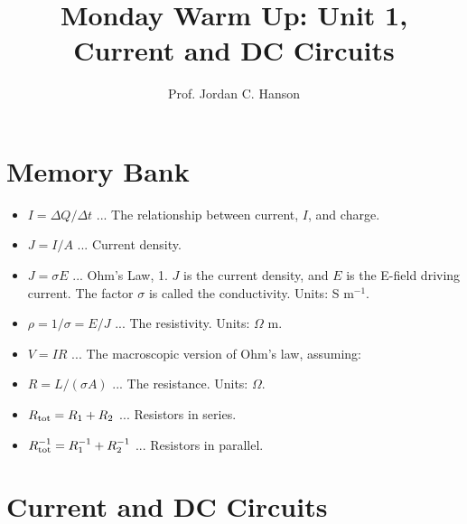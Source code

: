 \documentclass{article}
\begin{document}
\twocolumn

\title{Monday Warm Up: Unit 1, Current and DC Circuits}
\author{Prof. Jordan C. Hanson}

\maketitle

\section{Memory Bank}

\begin{itemize}
\item $I = \Delta Q / \Delta t$ ... The relationship between current, $I$, and charge.
\item $J = I/A$ ... Current density.
\item $J = \sigma E$ ... Ohm's Law, 1.  $J$ is the current density, and $E$ is the E-field driving current.  The factor $\sigma$ is called the conductivity.  Units: S m$^{-1}$.
\item $\rho = 1/\sigma = E/J$ ... The resistivity.  Units: $\Omega$ m.
\item $V = IR$ ... The macroscopic version of Ohm's law, assuming:
\item $R = L/(\sigma A)$ ... The resistance.  Units: $\Omega$.
\item $R_{\rm tot} = R_1 + R_2$ ... Resistors in series.
\item $R_{\rm tot}^{-1} = R_1^{-1} + R_2^{-1}$ ... Resistors in parallel.
\end{itemize}

\section{Current and DC Circuits}
\end{document}
